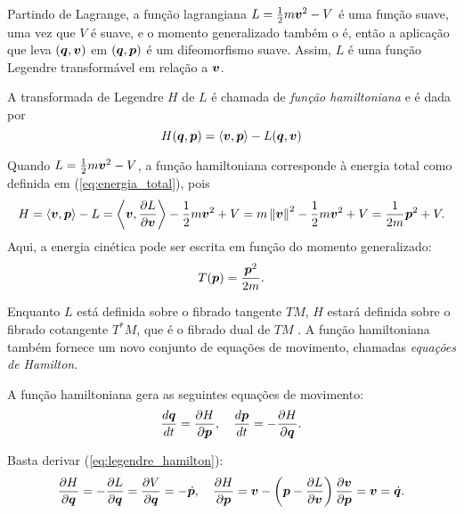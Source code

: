 Partindo de Lagrange, a função lagrangiana $L = \frac{1}{2} m \bm v^2 - V$ é uma função suave, uma vez que $V$ é suave, e o momento generalizado também o é, então a aplicação que leva $(\bm q, \bm v)$ em $(\bm q, \bm p)$ é um difeomorfismo suave. Assim, $L$ é uma função Legendre transformável em relação a $\bm v$.

\begin{definition}
    A transformada de Legendre $H$ de $L$ é chamada de \textit{função hamiltoniana} e é dada por
    \begin{equation}\label{eq:legendre_hamilton}
        H(\bm q, \bm p) = \left\langle \bm v, \bm p \right\rangle - L(\bm q, \bm v)
    \end{equation}
\end{definition}

\begin{observation}
    Quando $L = \frac{1}{2} m \bm v^2 - V$, a função hamiltoniana corresponde à energia total como definida em (\ref{eq:energia_total}), pois
    \begin{equation*}
        H = \left\langle \bm v, \bm p \right\rangle - L 
        = \left\langle \bm v, \dfrac{\partial L}{\partial \bm v} \right\rangle - \frac{1}{2} m \bm v^2 + V
        = m \left\Vert \bm v \right\Vert^2 - \frac{1}{2} m \bm v^2 + V
        = \frac{1}{2 m} \bm p^2 + V.
    \end{equation*}
    Aqui, a energia cinética pode ser escrita em função do momento generalizado:
    \begin{equation}
        T(\bm p) = \dfrac{\bm p^2}{2m}.
    \end{equation}
\end{observation}

Enquanto $L$ está definida sobre o fibrado tangente $TM$, $H$ estará definida sobre o fibrado cotangente $T^*M$, que é o fibrado dual de $TM$ \citep[192]{Tu2010-sb}. A função hamiltoniana também fornece um novo conjunto de equações de movimento, chamadas \textit{equações de Hamilton}.

\begin{theorem}\label{teorema:equacoes_hamilton}
    A função hamiltoniana gera as seguintes equações de movimento:
    \begin{equation*}
        \dfrac{d \bm q}{d t} = \dfrac{\partial H}{\partial \bm p},
        \quad
        \dfrac{d \bm p}{d t} = - \dfrac{\partial H}{\partial \bm q}.
    \end{equation*}
\end{theorem}
\begin{Proof}
    Basta derivar (\ref{eq:legendre_hamilton}):
    \begin{align*}
        \dfrac{\partial H}{\partial \bm q} = -\dfrac{\partial L}{\partial \bm q} = \dfrac{\partial V}{\partial \bm q} = - \dot {\bm p}, \quad
        \dfrac{\partial H}{\partial \bm p} = \bm v - \left(\bm p - \dfrac{\partial L}{\partial \bm v}\right) \dfrac{\partial \bm v}{\partial \bm p} = \bm v = \dot {\bm q}.
    \end{align*}
\end{Proof}

